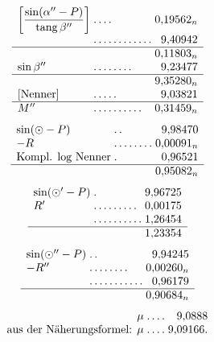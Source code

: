 \[
\begin{array}{l@{\;}l@{\;}r}
\left[\dfrac{\sin(\alpha''-P)}{\operatorname{tang}\beta''}\right]&\mathord{.}\,\mathord{.}\,\mathord{.}\,\mathord{.}&0{,}19562_n\\[3pt]
&\mathord{.}\,\mathord{.}\,\mathord{.}\,\mathord{.}\,\mathord{.}\,\mathord{.}\,\mathord{.}\,\mathord{.}\,\mathord{.}\,\mathord{.}\,\mathord{.}\,\mathord{.}&9{,}40942\\\hline
&&0{,}11803_n\\
\sin\beta''&\mathord{.}\,\mathord{.}\,\mathord{.}\,\mathord{.}\,\mathord{.}\,\mathord{.}\,\mathord{.}\,\mathord{.}&9{,}23477\\\hline
&&9{,}35280_n\\
{}[\text{Nenner}]&\mathord{.}\,\mathord{.}\,\mathord{.}\,\mathord{.}\,\mathord{.}&9{,}03821\\\hline
M''&\mathord{.}\,\mathord{.}\,\mathord{.}\,\mathord{.}\,\mathord{.}\,\mathord{.}\,\mathord{.}\,\mathord{.}\,\mathord{.}\,\mathord{.}&0{,}31459_n
\end{array}
\]
\[
\begin{array}{l@{\;}l@{\;}r}
\sin(\odot-P)&\mathord{.}\,\mathord{.}&9{,}98470\\
-R&\mathord{.}\,\mathord{.}\,\mathord{.}\,\mathord{.}\,\mathord{.}\,\mathord{.}\,\mathord{.}\,\mathord{.}&0{,}00091_n\\
\text{Kompl. log Nenner}&\mathord{.}&0{,}96521\\\hline
&&0{,}95082_n
\end{array}
\]
\[
\begin{array}{l@{\;}l@{\;}r}
\sin(\odot'-P)&\mathord{.}&9{,}96725\\
R'&\mathord{.}\,\mathord{.}\,\mathord{.}\,\mathord{.}\,\mathord{.}\,\mathord{.}\,\mathord{.}\,\mathord{.}\,\mathord{.}&0{,}00175\\
&\mathord{.}\,\mathord{.}\,\mathord{.}\,\mathord{.}\,\mathord{.}\,\mathord{.}\,\mathord{.}\,\mathord{.}\,\mathord{.}\,\mathord{.}&1{,}26454\\\hline
&&1{,}23354
\end{array}
\]
\[
\begin{array}{l@{\;}l@{\;}r}
\sin(\odot''-P)&\mathord{.}\,\mathord{.}&9{,}94245\\
-R''&\mathord{.}\,\mathord{.}\,\mathord{.}\,\mathord{.}\,\mathord{.}\,\mathord{.}\,\mathord{.}\,\mathord{.}&0{,}00260_n\\
&\mathord{.}\,\mathord{.}\,\mathord{.}\,\mathord{.}\,\mathord{.}\,\mathord{.}\,\mathord{.}\,\mathord{.}\,\mathord{.}\,\mathord{.}\,\mathord{.}&0{,}96179\\\hline
&&0{,}90684_n
\end{array}
\]
\[
\begin{array}{r@{\;}l@{\;}r}
\mu&\mathord{.}\,\mathord{.}\,\mathord{.}\,\mathord{.}&9{,}0888\\
\text{aus der Näherungsformel: }\mu&\mathord{.}\,\mathord{.}\,\mathord{.}\,\mathord{.}&9{,}09166.
\end{array}
\]

